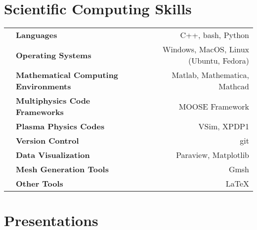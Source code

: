 \documentclass{article}
\begin{document}
\section*{Scientific Computing Skills}

	\begin{tabularx}{\textwidth}{l X r}
		\hspace {2em} & \textbf{Languages} & C++, bash, Python \\
					  & \textbf{Operating Systems} & Windows, MacOS, Linux (Ubuntu, Fedora) \\
					  & \textbf{Mathematical Computing Environments} & Matlab, Mathematica, Mathcad \\
					  & \textbf{Multiphysics Code Frameworks} & MOOSE Framework \\
					  & \textbf{Plasma Physics Codes} & VSim, XPDP1 \\
					  & \textbf{Version Control} & git \\
					  & \textbf{Data Visualization} & Paraview, Matplotlib \\
					  & \textbf{Mesh Generation Tools} & Gmsh \\
					  & \textbf{Other Tools} & \LaTeX
	\end{tabularx}

\section*{Presentations}
\end{document}
